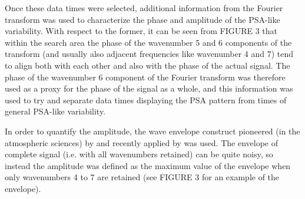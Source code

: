 Once these data times were selected, additional information from the Fourier transform was used to characterize the phase and amplitude of the PSA-like variability. With respect to the former, it can be seen from FIGURE 3 that within the search area the phase of the wavenumber 5 and 6 components of the transform (and usually also adjacent frequencies like wavenumber 4 and 7) tend to align both with each other and also with the phase of the actual signal. The phase of the wavenumber 6 component of the Fourier transform was therefore used as a proxy for the phase of the signal as a whole, and this information was used to try and separate data times displaying the PSA pattern from times of general PSA-like variability.

In order to quantify the amplitude, the wave envelope construct pioneered (in the atmospheric sciences) by \citet{Zimin2003} and recently applied by \citet{IrvingSimmonds2015} was used. The envelope of complete signal (i.e. with all wavenumbers retained) can be quite noisy, so instead the amplitude was defined as the maximum value of the envelope when only wavenumbers 4 to 7 are retained (see FIGURE 3 for an example of the envelope).


